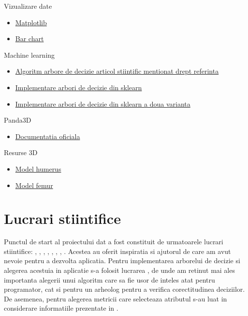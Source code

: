 \documentclass[runningheads,a4paper,11pt]{report}
\begin{document}
\noindent Vizualizare date
\begin{itemize}
    \item \href{https://matplotlib.org/stable/tutorials/introductory/pyplot.html}{Matplotlib}
    \item \href{https://pythonbasics.org/matplotlib-bar-chart/}{Bar chart}
\end{itemize}

\noindent Machine learning
\begin{itemize}
    \item \href{https://en.wikipedia.org/wiki/ID3_algorithm}{Algoritm arbore de decizie articol stiintific mentionat drept referinta}
    \item \href{https://machinelearningmastery.com/classification-and-regression-trees-for-machine-learning/}{Implementare arbori de decizie din sklearn}
    \item \href{https://www.datacamp.com/community/tutorials/decision-tree-classification-python}{Implementare arbori de decizie din sklearn a doua varianta}
\end{itemize}

\noindent Panda3D
\begin{itemize}
    \item \href{https://www.panda3d.org/}{Documentatia oficiala}
\end{itemize}

\noindent Resurse 3D
\begin{itemize}
    \item \href{https://sketchfab.com/3d-models/human-humerus-548132dc5a0a423581e2cba2014ea521}{Model humerus}
    \item \href{https://www.cgtrader.com/items/1020990/download-page}{Model femur}
\end{itemize}

\chapter{Lucrari stiintifice}
\label{chapter:lucrariStiintifice}

Punctul de start al proiectului dat a fost constituit de urmatoarele lucrari stiintifice: \cite{doc1}, \cite{doc2}, \cite{doc3}, \cite{doc4}, \cite{doc5}, \cite{doc6}, \cite{doc7}, \cite{doc8}. Acestea au oferit inspiratia si ajutorul de care am avut nevoie pentru a dezvolta aplicatia. \newline \newline
Pentru implementarea arborelui de decizie si alegerea acestuia in aplicatie s-a folosit lucrarea  \cite{doc7}, de unde am retinut mai ales importanta alegerii unui algoritm care sa fie usor de inteles atat pentru programator, cat si pentru un arheolog pentru a verifica corectitudinea deciziilor. De asemenea, pentru alegerea metricii care selecteaza atributul s-au luat in considerare informatiile prezentate in \cite{doc6}.



\end{document}
